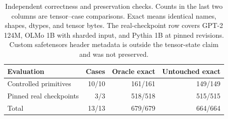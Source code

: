 \begin{table}[t]
  \centering
  \small
  \begin{tabular}{lrrr}
    \toprule
    Evaluation & Cases & Oracle exact & Untouched exact \\
    \midrule
    Controlled primitives & 10/10 & 161/161 & 149/149 \\
    Pinned real checkpoints & 3/3 & 518/518 & 515/515 \\
    \midrule
    Total & 13/13 & 679/679 & 664/664 \\
    \bottomrule
  \end{tabular}
  \caption{Independent correctness and preservation checks. Counts in the last
  two columns are tensor--case comparisons. Exact means identical names,
  shapes, dtypes, and tensor bytes. The real-checkpoint row covers GPT-2 124M,
  OLMo 1B with sharded input, and Pythia 1B at pinned revisions. Custom
  safetensors header metadata is outside the tensor-state claim and was not
  preserved.}
  \label{tab:correctness-preservation}
\end{table}
